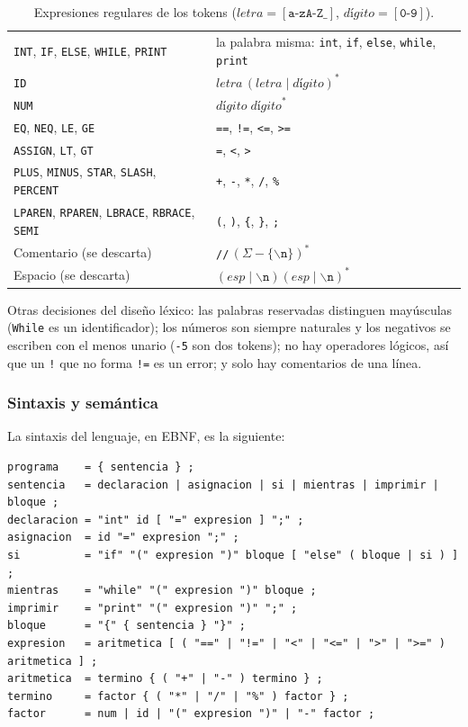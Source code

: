 \documentclass[11pt,a4paper]{article}
\newenvironment{grilla}{\footnotesize\renewcommand{\arraystretch}{1.45}\setlength{\tabcolsep}{5pt}}{}
\theoremstyle{definition}
\newcommand{\tm}[1]{\texttt{#1}}
\renewcommand{\paragraph}[1]{\subsubsection*{#1}}
\begin{document}
\begin{table}[H]
\centering
\begin{grilla}
\begin{tabular}{|L{5.6cm}|L{8.3cm}|}
\hline
{} &  \\ \hline
\tm{INT}, \tm{IF}, \tm{ELSE}, \tm{WHILE}, \tm{PRINT} & la palabra misma: \tm{int}, \tm{if}, \tm{else}, \tm{while}, \tm{print} \\ \hline
\tm{ID} & $\textit{letra}\,(\textit{letra} \mid \textit{dígito})^{*}$ \\ \hline
\tm{NUM} & $\textit{dígito}\;\textit{dígito}^{*}$ \\ \hline
\tm{EQ}, \tm{NEQ}, \tm{LE}, \tm{GE} & \tm{==}, \tm{!=}, \tm{<=}, \tm{>=} \\ \hline
\tm{ASSIGN}, \tm{LT}, \tm{GT} & \tm{=}, \tm{<}, \tm{>} \\ \hline
\tm{PLUS}, \tm{MINUS}, \tm{STAR}, \tm{SLASH}, \tm{PERCENT} & \tm{+}, \tm{-}, \tm{*}, \tm{/}, \tm{\%} \\ \hline
\tm{LPAREN}, \tm{RPAREN}, \tm{LBRACE}, \tm{RBRACE}, \tm{SEMI} & \tm{(}, \tm{)}, \tm{\{}, \tm{\}}, \tm{;} \\ \hline
Comentario (se descarta) & \tm{//}\,$(\Sigma - \{\backslash\tm{n}\})^{*}$ \\ \hline
Espacio (se descarta) & $(\textit{esp} \mid \backslash\tm{n})(\textit{esp} \mid \backslash\tm{n})^{*}$ \\ \hline
\end{tabular}
\end{grilla}
\caption{Expresiones regulares de los \NTokens{} tokens ($\textit{letra} = [\tm{a-zA-Z\_}]$, $\textit{dígito} = [\tm{0-9}]$).}
\label{tab:er}
\end{table}

Otras decisiones del diseño léxico: las palabras reservadas distinguen
mayúsculas (\tm{While} es un identificador); los números son siempre
naturales y los negativos se escriben con el menos unario (\tm{-5} son dos
tokens); no hay operadores lógicos, así que un \tm{!} que no forma \tm{!=}
es un error; y solo hay comentarios de una línea.

\paragraph{Sintaxis y semántica}

La sintaxis del lenguaje, en EBNF, es la siguiente:

\begin{Verbatim}[fontsize=\scriptsize]
programa    = { sentencia } ;
sentencia   = declaracion | asignacion | si | mientras | imprimir | bloque ;
declaracion = "int" id [ "=" expresion ] ";" ;
asignacion  = id "=" expresion ";" ;
si          = "if" "(" expresion ")" bloque [ "else" ( bloque | si ) ] ;
mientras    = "while" "(" expresion ")" bloque ;
imprimir    = "print" "(" expresion ")" ";" ;
bloque      = "{" { sentencia } "}" ;
expresion   = aritmetica [ ( "==" | "!=" | "<" | "<=" | ">" | ">=" ) aritmetica ] ;
aritmetica  = termino { ( "+" | "-" ) termino } ;
termino     = factor { ( "*" | "/" | "%" ) factor } ;
factor      = num | id | "(" expresion ")" | "-" factor ;
\end{Verbatim}
\end{document}
